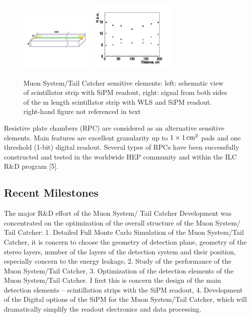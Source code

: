 \begin{figure}
	\centering
	\includegraphics[width=.495\textwidth]{MuonDetector/MuonDetectorILD/muonDetectorSensitiveElements}\hfill
	\includegraphics[width=.495\textwidth]{MuonDetector/MuonDetectorILD/muonDetectorSignalReadout}
	\caption{Muon System/Tail Catcher sensitive elements:
left: schematic view of scintillator strip with SiPM readout, right: signal from both sides of the \unit[2]{m} length scintillator strip with WLS and SiPM readout. {\color{red} right-hand figure not referenced in text}}
	\label{fig:Muon:ILDMuon:sensitive}
\end{figure}


Resistive plate chambers (RPC) are considered as an alternative sensitive elements. Main features are excellent granularity up to $1\times\unit[1]{cm^2}$ pads and one
threshold (1-bit) digital readout. Several types of RPCs have been successfully constructed and tested in the worldwide HEP community and within the ILC R\&D program [5].


\subsection{Recent Milestones}
The major R\&D effort of the Muon System/ Tail Catcher Development was concentrated on the optimization of the overall structure of the Muon System/ Tail Catcher:
1.	Detailed Full Monte Carlo Simulation of the Muon System/Tail Catcher, it is concern to choose the geometry of detection plane, geometry of the stereo layers, number of the layers of the detection system and their position, especially concern to the energy leakage,
2.	Study of the performance of the Muon System/Tail Catcher,
3.	Optimization of the detection elements of the Muon System/Tail Catcher. I first this is concern the design of the main detection elements – scintillation strips with the SiPM readout,
4.	Development of the Digital options of the SiPM for the Muon System/Tail Catcher, which will dramatically simplify the readout electronics and data processing.


